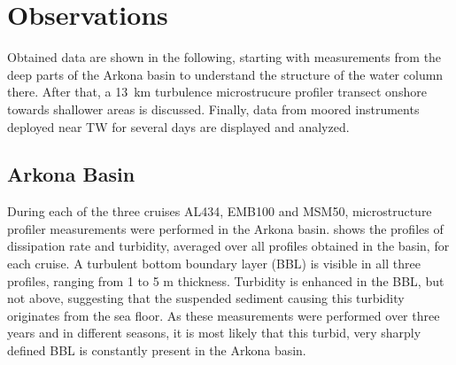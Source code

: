 \section{Observations}

Obtained data are shown in the following, starting with measurements from the 
deep parts of the Arkona basin to understand the structure of the water 
column there. After that, a 13~km turbulence microstrucure profiler transect 
onshore towards shallower areas is discussed. Finally, data from moored 
instruments deployed near TW for several days are displayed and analyzed.

\subsection{Arkona Basin}

 During each of the three cruises AL434, EMB100 and MSM50, microstructure 
profiler measurements were performed in the Arkona basin.  shows the 
profiles of 
dissipation rate and turbidity, averaged over all profiles obtained in the 
basin, for each cruise. A turbulent bottom boundary layer (BBL) is visible in 
all three profiles, ranging from 1 to 5 m thickness. 
Turbidity is enhanced in the BBL, but not above, suggesting that the suspended 
sediment causing this turbidity originates from the sea floor. As these 
measurements were performed over three years and in different 
seasons, it is most likely that this turbid, very sharply defined BBL is 
constantly present in the Arkona basin.

